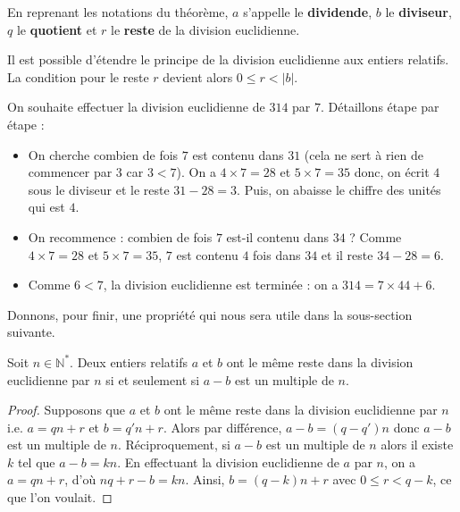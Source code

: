   \begin{definition}
    En reprenant les notations du théorème, $a$ s'appelle le \textbf{dividende}, $b$ le \textbf{diviseur}, $q$ le \textbf{quotient} et $r$ le \textbf{reste} de la division euclidienne.
  \end{definition}
  
  \begin{remark}
    Il est possible d'étendre le principe de la division euclidienne aux entiers relatifs. La condition pour le reste $r$ devient alors $0 \leq r < |b|$.
  \end{remark}
  
  \begin{example}
    On souhaite effectuer la division euclidienne de $314$ par $7$. Détaillons étape par étape :
    \begin{itemize}
      \item On cherche combien de fois $7$ est contenu dans $31$ (cela ne sert à rien de commencer par $3$ car $3 < 7$). On a $4 \times 7 = 28$ et $5 \times 7 = 35$ donc, on écrit $4$ sous le diviseur et le reste $31 - 28 = 3$. Puis, on abaisse le chiffre des unités qui est $4$.
      \item On recommence : combien de fois $7$ est-il contenu dans $34$ ? Comme $4 \times 7 = 28$ et $5 \times 7 = 35$, $7$ est contenu $4$ fois dans $34$ et il reste $34 - 28 = 6$.
      \item Comme $6 < 7$, la division euclidienne est terminée : on a $314 = 7 \times 44 + 6$.
    \end{itemize}
  \end{example}
  
  Donnons, pour finir, une propriété qui nous sera utile dans la sous-section suivante.
  
  \begin{proposition}
    Soit $n \in \mathbb{N}^*$. Deux entiers relatifs $a$ et $b$ ont le même reste dans la division euclidienne par $n$ si et seulement si $a-b$ est un multiple de $n$.
  \end{proposition}
  
  \begin{proof}
    Supposons que $a$ et $b$ ont le même reste dans la division euclidienne par $n$ i.e. $a = qn + r$ et $b = q'n + r$. Alors par différence, $a - b = (q-q')n$ donc $a-b$ est un multiple de $n$.
    \newpar
    Réciproquement, si $a-b$ est un multiple de $n$ alors il existe $k$ tel que $a-b = kn$. En effectuant la division euclidienne de $a$ par $n$, on a $a = qn + r$, d'où $nq + r -b = kn$. Ainsi, $b = (q-k)n + r$ avec $0 \leq r < q-k$, ce que l'on voulait.
  \end{proof}
  
